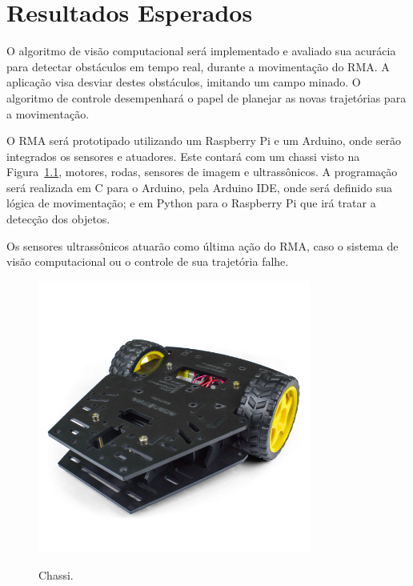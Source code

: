 \chapter{Resultados Esperados}
\label{chap:ResultadosEsperados}

O algoritmo de visão computacional será implementado e avaliado sua acurácia para detectar obstáculos em tempo real, durante a movimentação do RMA. A aplicação visa desviar destes obstáculos, imitando um campo minado. O algoritmo de controle desempenhará o papel de planejar as novas trajetórias para a movimentação.

O RMA será prototipado utilizando um Raspberry Pi e um Arduino, onde serão integrados os sensores e atuadores. Este contará com um chassi visto na Figura~\ref{fig:chassi}, motores, rodas, sensores de imagem e ultrassônicos. A programação será realizada em C para o Arduino, pela Arduino IDE, onde será definido sua lógica de movimentação; e em Python para o Raspberry Pi que irá tratar a detecção dos objetos.

Os sensores ultrassônicos atuarão como última ação do RMA, caso o sistema de visão computacional ou o controle de sua trajetória falhe.

\begin{figure}[!hbtp]
  \centering
   \caption{Chassi.}
    \includegraphics[width = 0.8\textwidth]{Caps/Figs/resultados/582_1_H.png}
   \label{fig:chassi}
\end{figure}

